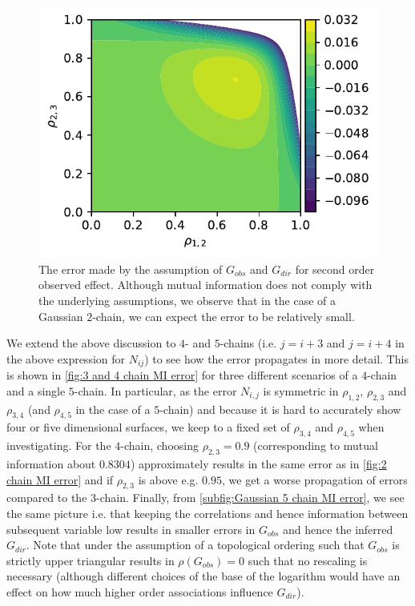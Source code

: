 \documentclass[../Thesis.tex]{subfiles}
\begin{document}
\begin{figure}[ht]
    \centering
    \includegraphics[width=.7\linewidth]{figures/Gaussian Chain Theoretical/2 chain error - MI.pdf}
    \caption{The error made by the assumption of $G_{obs}$ and $G_{dir}$ for second order observed effect. Although mutual information does not comply with the underlying assumptions, we observe that in the case of a Gaussian $2$-chain, we can expect the error to be relatively small.}
    \label{fig:2 chain MI error}
\end{figure}

We extend the above discussion to $4$- and $5$-chains (i.e. $j = i + 3$ and $j = i + 4$ in the above expression for $N_{ij}$) to see how the error propagates in more detail. This is shown in \autoref{fig:3 and 4 chain MI error} for three different scenarios of a $4$-chain and a single $5$-chain. In particular, as the error $N_{i,j}$ is symmetric in $\rho_{1,2}$, $\rho_{2,3}$ and $\rho_{3,4}$ (and $\rho_{4,5}$ in the case of a $5$-chain) and because it is hard to accurately show four or five dimensional surfaces, we keep to a fixed set of $\rho_{3,4}$ and $\rho_{4,5}$ when investigating. For the $4$-chain, choosing $\rho_{2,3} = 0.9$ (corresponding to mutual information about $0.8304$) approximately results in the same error as in \autoref{fig:2 chain MI error} and if $\rho_{2,3}$ is above e.g. $0.95$, we get a worse propagation of errors compared to the $3$-chain. Finally, from \autoref{subfig:Gaussian 5 chain MI error}, we see the same picture i.e. that keeping the correlations and hence information between subsequent variable low results in smaller errors in $G_{obs}$ and hence the inferred $G_{dir}$. Note that under the assumption of a topological ordering such that $G_{obs}$ is strictly upper triangular results in $\rho\left(G_{obs}\right) = 0$ such that no rescaling is necessary (although different choices of the base of the logarithm would have an effect on how much higher order associations influence $G_{dir}$).
\end{document}
